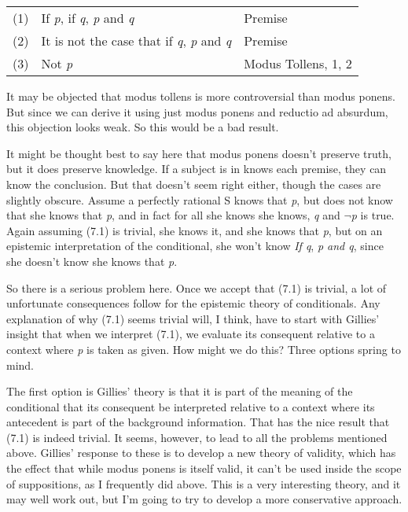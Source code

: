 \documentclass[
  11pt,
  letterpaper,
  DIV=11,
  numbers=noendperiod,
  oneside]{scrartcl}
\begin{document}
\begin{longtable}[]{@{}
  >{\raggedleft\arraybackslash}p{}
  >{\raggedright\arraybackslash}p{}
  >{\raggedright\arraybackslash}p{}@{}}
\toprule\noalign{}
\endhead
\bottomrule\noalign{}
\endlastfoot
(1) & If \emph{p}, if \emph{q}, \emph{p} and \emph{q} & Premise \\
(2) & It is not the case that if \emph{q}, \emph{p} and \emph{q} &
Premise \\
(3) & Not \emph{p} & Modus Tollens, 1, 2 \\
\end{longtable}

It may be objected that modus tollens is more controversial than modus
ponens. But since we can derive it using just modus ponens and reductio
ad absurdum, this objection looks weak. So this would be a bad result.

It might be thought best to say here that modus ponens doesn't preserve
truth, but it does preserve knowledge. If a subject is in knows each
premise, they can know the conclusion. But that doesn't seem right
either, though the cases are slightly obscure. Assume a perfectly
rational S knows that \emph{p}, but does not know that she knows that
\emph{p}, and in fact for all she knows she knows, \emph{q} and
\(\neg\)\emph{p} is true. Again assuming (7.1) is trivial, she knows it,
and she knows that \emph{p}, but on an epistemic interpretation of the
conditional, she won't know \emph{If q}, \emph{p and q}, since she
doesn't know she knows that \emph{p}.

So there is a serious problem here. Once we accept that (7.1) is
trivial, a lot of unfortunate consequences follow for the epistemic
theory of conditionals. Any explanation of why (7.1) seems trivial will,
I think, have to start with Gillies' insight that when we interpret
(7.1), we evaluate its consequent relative to a context where \emph{p}
is taken as given. How might we do this? Three options spring to mind.

The first option is Gillies' theory is that it is part of the meaning of
the conditional that its consequent be interpreted relative to a context
where its antecedent is part of the background information. That has the
nice result that (7.1) is indeed trivial. It seems, however, to lead to
all the problems mentioned above. Gillies' response to these is to
develop a new theory of validity, which has the effect that while modus
ponens is itself valid, it can't be used inside the scope of
suppositions, as I frequently did above. This is a very interesting
theory, and it may well work out, but I'm going to try to develop a more
conservative approach.
\end{document}
